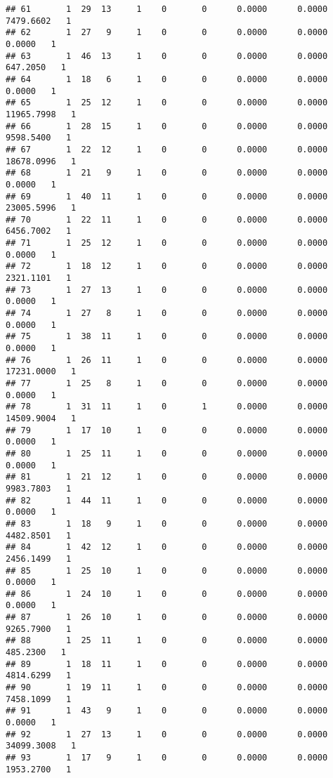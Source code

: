 \documentclass[
]{article}
\begin{document}
\begin{enumerate}
\begin{verbatim}
## 61       1  29  13     1    0       0      0.0000      0.0000   7479.6602   1
## 62       1  27   9     1    0       0      0.0000      0.0000      0.0000   1
## 63       1  46  13     1    0       0      0.0000      0.0000    647.2050   1
## 64       1  18   6     1    0       0      0.0000      0.0000      0.0000   1
## 65       1  25  12     1    0       0      0.0000      0.0000  11965.7998   1
## 66       1  28  15     1    0       0      0.0000      0.0000   9598.5400   1
## 67       1  22  12     1    0       0      0.0000      0.0000  18678.0996   1
## 68       1  21   9     1    0       0      0.0000      0.0000      0.0000   1
## 69       1  40  11     1    0       0      0.0000      0.0000  23005.5996   1
## 70       1  22  11     1    0       0      0.0000      0.0000   6456.7002   1
## 71       1  25  12     1    0       0      0.0000      0.0000      0.0000   1
## 72       1  18  12     1    0       0      0.0000      0.0000   2321.1101   1
## 73       1  27  13     1    0       0      0.0000      0.0000      0.0000   1
## 74       1  27   8     1    0       0      0.0000      0.0000      0.0000   1
## 75       1  38  11     1    0       0      0.0000      0.0000      0.0000   1
## 76       1  26  11     1    0       0      0.0000      0.0000  17231.0000   1
## 77       1  25   8     1    0       0      0.0000      0.0000      0.0000   1
## 78       1  31  11     1    0       1      0.0000      0.0000  14509.9004   1
## 79       1  17  10     1    0       0      0.0000      0.0000      0.0000   1
## 80       1  25  11     1    0       0      0.0000      0.0000      0.0000   1
## 81       1  21  12     1    0       0      0.0000      0.0000   9983.7803   1
## 82       1  44  11     1    0       0      0.0000      0.0000      0.0000   1
## 83       1  18   9     1    0       0      0.0000      0.0000   4482.8501   1
## 84       1  42  12     1    0       0      0.0000      0.0000   2456.1499   1
## 85       1  25  10     1    0       0      0.0000      0.0000      0.0000   1
## 86       1  24  10     1    0       0      0.0000      0.0000      0.0000   1
## 87       1  26  10     1    0       0      0.0000      0.0000   9265.7900   1
## 88       1  25  11     1    0       0      0.0000      0.0000    485.2300   1
## 89       1  18  11     1    0       0      0.0000      0.0000   4814.6299   1
## 90       1  19  11     1    0       0      0.0000      0.0000   7458.1099   1
## 91       1  43   9     1    0       0      0.0000      0.0000      0.0000   1
## 92       1  27  13     1    0       0      0.0000      0.0000  34099.3008   1
## 93       1  17   9     1    0       0      0.0000      0.0000   1953.2700   1

\end{verbatim}
\end{enumerate}
\end{document}
